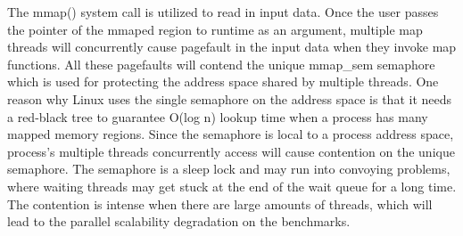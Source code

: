 The mmap() system call is utilized to read in input data. 
Once the user passes the pointer of the mmaped region to runtime as an argument, 
multiple map threads will concurrently cause pagefault in the input data when they invoke map functions.
All these pagefaults will contend the unique mmap\_sem semaphore
which is used for protecting the address space shared by multiple threads.
One reason why Linux uses the single semaphore on the address space is 
that it needs a red-black tree to guarantee O(log n)
lookup time when a process has many mapped memory regions\cite{linux}. 
Since the semaphore is local to a process address space,
process's multiple threads concurrently access will cause contention on the unique semaphore.
The semaphore is a sleep lock and may run into convoying problems,
where waiting threads may get stuck at the end of the wait queue for a long time\cite{Andi2009lmulticore}.
The contention is intense when there are large amounts of threads,
which will lead to the parallel scalability degradation on the benchmarks.









